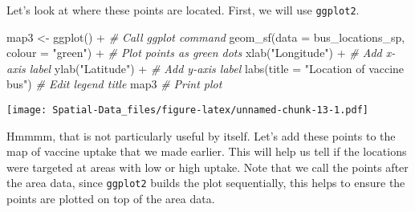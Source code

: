 \documentclass[
]{book}
\newenvironment{Shaded}{\begin{snugshade}}{\end{snugshade}}
\newcommand{\AttributeTok}[1]{\textcolor[rgb]{0.77,0.63,0.00}{#1}}
\newcommand{\CommentTok}[1]{\textcolor[rgb]{0.56,0.35,0.01}{\textit{#1}}}
\newcommand{\FunctionTok}[1]{\textcolor[rgb]{0.00,0.00,0.00}{#1}}
\newcommand{\NormalTok}[1]{#1}
\newcommand{\OtherTok}[1]{\textcolor[rgb]{0.56,0.35,0.01}{#1}}
\newcommand{\SpecialCharTok}[1]{\textcolor[rgb]{0.00,0.00,0.00}{#1}}
\newcommand{\StringTok}[1]{\textcolor[rgb]{0.31,0.60,0.02}{#1}}
\begin{document}
Let's look at where these points are located. First, we will use \texttt{ggplot2}.

\begin{Shaded}
\begin{Highlighting}[]
\NormalTok{map3 }\OtherTok{\textless{}{-}} \FunctionTok{ggplot}\NormalTok{() }\SpecialCharTok{+} \CommentTok{\# Call ggplot command}
            \FunctionTok{geom\_sf}\NormalTok{(}\AttributeTok{data =}\NormalTok{ bus\_locations\_sp, }\AttributeTok{colour =} \StringTok{"green"}\NormalTok{) }\SpecialCharTok{+} \CommentTok{\# Plot points as green dots}
            \FunctionTok{xlab}\NormalTok{(}\StringTok{"Longitude"}\NormalTok{) }\SpecialCharTok{+} \CommentTok{\# Add x{-}axis label}
            \FunctionTok{ylab}\NormalTok{(}\StringTok{"Latitude"}\NormalTok{) }\SpecialCharTok{+} \CommentTok{\# Add y{-}axis label}
            \FunctionTok{labs}\NormalTok{(}\AttributeTok{title =} \StringTok{"Location of vaccine bus"}\NormalTok{) }\CommentTok{\# Edit legend title}
\NormalTok{map3 }\CommentTok{\# Print plot}
\end{Highlighting}
\end{Shaded}

\texttt{[image: Spatial-Data\_files/figure-latex/unnamed-chunk-13-1.pdf]}

Hmmmm, that is not particularly useful by itself. Let's add these points to the map of vaccine uptake that we made earlier. This will help us tell if the locations were targeted at areas with low or high uptake. Note that we call the points after the area data, since \texttt{ggplot2} builds the plot sequentially, this helps to ensure the points are plotted on top of the area data.
\end{document}
